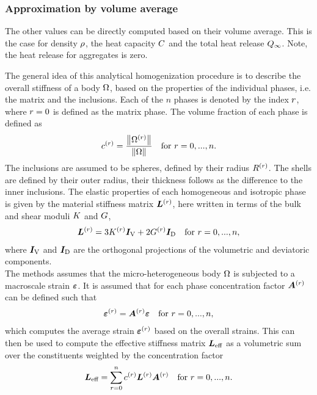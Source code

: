 \subsubsection{Approximation by volume average}
The other values can be directly computed based on their volume average.
This is the case for density $\rho$, the heat capacity $C$ and the total heat release $Q_{\infty}$.
Note, the heat release for aggregates is zero.







The general idea of this analytical homogenization procedure is to describe the overall stiffness of a body $\Omega$, based on the properties of the individual phases, i.e. the matrix and the inclusions.
Each of the $n$ phases is denoted by the index $r$, where $r = 0$ is defined as the matrix phase.
The volume fraction of each phase is defined as
\begin{align}
	c^{(r)} = \frac{\left\| \Omega^{(r)} \right\|}{\left\| \Omega \right\|} \quad  \text{for}~ r = 0, ..., n.
\end{align}
The inclusions are assumed to be spheres, defined by their radius $R^{(r)}$.
The shells are defined by their outer radius, their thickness follows as the difference to the inner inclusions.
The elastic properties of each homogeneous and isotropic phase is given by the material stiffness matrix $\boldsymbol{L}^{(r)}$, here written in terms of the bulk and shear moduli $K$ and $G$,
\begin{align}
	\boldsymbol{L}^{(r)}= 3 K^{(r)} \boldsymbol{I}_{\text{V}} + 2 G^{(r)} \boldsymbol{I}_{\text{D}}  \quad \text{for}~ r = 0, ..., n, \label{eq:Lr}
\end{align}
where $\boldsymbol{I}_{\text{V}}$ and $\boldsymbol{I}_{\text{D}}$ are the orthogonal projections of the volumetric and deviatoric components.\\
The methods assumes that the micro-heterogeneous body $\Omega$ is subjected to a macroscale strain $\boldsymbol{\varepsilon}$.
It is assumed that for each phase concentration factor $\boldsymbol{A}^{(r)}$ can be defined such that
\begin{align}
	\boldsymbol{\varepsilon}^{(r)} = \boldsymbol{A}^{(r)}\boldsymbol{\varepsilon} \quad  \text{for}~ r = 0, ..., n, \label{eq:strainaverage}
\end{align}
which computes the average strain $\boldsymbol{\varepsilon}^{(r)}$ based on the overall strains.
This can then be used to compute the effective stiffness matrix $\boldsymbol{L}_{\text{eff}}$ as a volumetric sum over the constituents weighted by the concentration factor 
\begin{align}
	\boldsymbol{L}_{\text{eff}} = \sum_{r=0}^{n} c^{(r)} \boldsymbol{L}^{(r)}\boldsymbol{A}^{(r)} \quad  \text{for}~ r = 0, ..., n.\label{eq:Leff}
\end{align}

